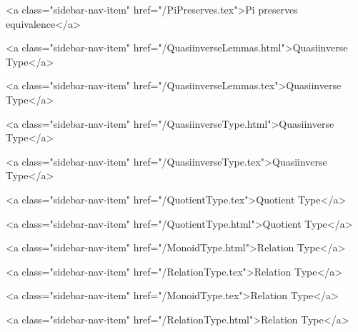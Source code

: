       
        
          <a class="sidebar-nav-item" href="/PiPreserves.tex">Pi preserves equivalence</a>
        
      
    
      
        
          <a class="sidebar-nav-item" href="/QuasiinverseLemmas.html">Quasiinverse Type</a>
        
      
    
      
        
          <a class="sidebar-nav-item" href="/QuasiinverseLemmas.tex">Quasiinverse Type</a>
        
      
    
      
        
          <a class="sidebar-nav-item" href="/QuasiinverseType.html">Quasiinverse Type</a>
        
      
    
      
        
          <a class="sidebar-nav-item" href="/QuasiinverseType.tex">Quasiinverse Type</a>
        
      
    
      
        
          <a class="sidebar-nav-item" href="/QuotientType.tex">Quotient Type</a>
        
      
    
      
        
          <a class="sidebar-nav-item" href="/QuotientType.html">Quotient Type</a>
        
      
    
      
        
          <a class="sidebar-nav-item" href="/MonoidType.html">Relation Type</a>
        
      
    
      
        
          <a class="sidebar-nav-item" href="/RelationType.tex">Relation Type</a>
        
      
    
      
        
          <a class="sidebar-nav-item" href="/MonoidType.tex">Relation Type</a>
        
      
    
      
        
          <a class="sidebar-nav-item" href="/RelationType.html">Relation Type</a>
        
